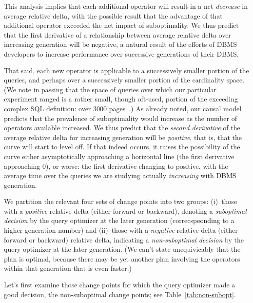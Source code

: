 \documentclass[prodmode,acmtods]{acmsmall}
\begin{document}
This analysis implies that each additional operator will result in a net {\em
  decrease} in average relative delta, with the possible result that the advantage of that
additional operator exceeded the net impact of suboptimality. We thus
predict that the first derivative of a relationship between average relative delta over
increasing generation will be negative, a natural result of the efforts of
\hbox{DBMS} developers to increase performance over successive generations of their
\hbox{DBMS}. 

That said, each new operator is applicable to a successively smaller portion
of the queries, and perhaps over a successively smaller portion of the
cardinality space.  (We note in passing that the space of queries over which
our particular experiment ranged is a rather small, though oft-used, portion
of the exceeding complex SQL definition: over 3000 pages~\cite{Melton11}.)
As already noted, our causal model predicts that the prevalence of suboptimality
would increase as the number of operators available increased. We thus predict that
the {\em second derivative} of the average relative delta for increasing
generation will be {\em positive}, that is, that the curve will start to
level off. If that indeed occurs, it raises the
possibility of the curve either asymptotically approaching a horizontal line
(the first derivative approaching 0), or worse: the first derivative
changing to positive, with the average time over the queries we are studying
actually {\em increasing} with \hbox{DBMS} generation. 

We partition the relevant four sets of change points into two groups: (i)~those
with a {\em positive} relative delta (either forward or backward), denoting a
{\em suboptimal decision} by the query optimizer at the later generation
(correcspeonding to a higher generation number)
and (ii)~those with a {\em negative} relative delta (either forward or
backward) relative delta, indicating a {\em non-suboptimal decision} by the
query optimizer at the later generation. (We can't state unequivicably that
the plan is optimal, because there may be yet another plan involving the
operators within that generation that is even faster.)

Let's first examine those change points for which the query optimizer made a
good decision, the non-suboptimal change points; see
Table~\ref{tab:non-subopt}.
\end{document}
